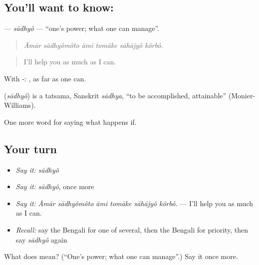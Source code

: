 \subsection*{You'll want to know: }
\textbf{} — \emph{sādhyô} — \textquotedblleft{}one's power; what one can manage\textquotedblright{}.

\begin{quote}
     
\end{quote}

\begin{quote}
\emph{Āmār sādhyômôto āmi tomāke sāhājyô kôrbô.}
\end{quote}

\begin{quote}
I'll help you as much as I can.
\end{quote}

With -: , as far as one can.

\begin{cousinweb}
\textbf{} (\emph{sādhyô}) is a tatsama, Sanskrit \emph{sādhya}, \textquotedblleft{}to be accomplished, attainable\textquotedblright{} (Monier-Williams).
\end{cousinweb}

\begin{grammarlens}[title={What you've built}]
One more word for saying what happens if.
\end{grammarlens}

\subsection*{Your turn}
\begin{itemize}
\raggedright
  \item \emph{Say it:} \emph{sādhyô}
  \item \emph{Say it:} \emph{sādhyô}, once more
  \item \emph{Say it:} \emph{Āmār sādhyômôto āmi tomāke sāhājyô kôrbô.} — I'll help you as much as I can.
  \item \emph{Recall:} say the Bengali for one of several, then the Bengali for priority, then say \emph{sādhyô} again
\end{itemize}

\begin{tcolorbox}[breakable,colback=teal!4,colframe=teal!35!black,title={Before you move on}]
What does  mean? (\textquotedblleft{}One's power; what one can manage\textquotedblright{}.) Say it once more.
\end{tcolorbox}
